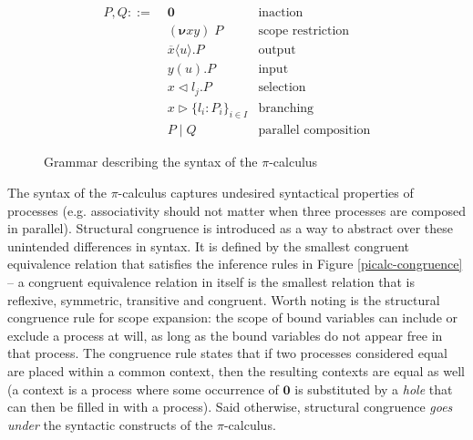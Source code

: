 \documentclass{mproj}
\newcommand{\PO}{\mathbf{0}}
\newcommand{\comp}[2]{#1 \mid #2}
\newcommand{\new}[2]{(\boldsymbol{\nu} #1 #2) \;}
\newcommand{\cout}[2]{\overline{#1}\langle#2\rangle.}
\newcommand{\cin}[2]{#1(#2).}
\newcommand{\select}[2]{#1\triangleleft#2.}
\newcommand{\branch}[2]{#1\triangleright#2}
\newcommand{\picalc}{$\pi$-calculus}
\begin{document}
\begin{figure}[H]
    \begin{align*}
    P,Q ::= \; &\PO                      & \text{inaction}             \\
               &\new{x}{y}P              & \text{scope restriction}    \\
               &\cout{x}{u}P             & \text{output}               \\
               &\cin{y}{u}P              & \text{input}                \\
               &\select{x}{l_j}P         & \text{selection}            \\
               &\branch{x}
               {\{l_i : P_i\}_{i \in I}} & \text{branching}            \\
               &\comp{P}{Q}              & \text{parallel composition}
    \end{align*}
    \caption{Grammar describing the syntax of the \picalc{}}
    \label{picalc-syntax}
\end{figure}

The syntax of the \picalc{} captures undesired syntactical properties of processes (e.g. associativity should not matter when three processes are composed in parallel). Structural congruence is introduced as a way to abstract over these unintended differences in syntax. It is defined by the smallest congruent equivalence relation that satisfies the inference rules in Figure \ref{picalc-congruence} -- a congruent equivalence relation in itself is the smallest relation that is reflexive, symmetric, transitive and congruent. Worth noting is the structural congruence rule for scope expansion: the scope of bound variables can include or exclude a process at will, as long as the bound variables do not appear free in that process. The congruence rule states that if two processes considered equal are placed within a common context, then the resulting contexts are equal as well (a context is a process where some occurrence of $\PO$ is substituted by a \emph{hole} that can then be filled in with a process). Said otherwise, structural congruence \emph{goes under} the syntactic constructs of the \picalc{}.
\end{document}
